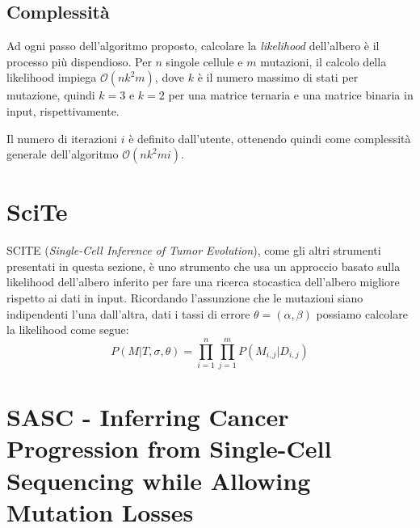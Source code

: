\subsection{Complessità}
Ad ogni passo dell'algoritmo proposto, calcolare la \textit{likelihood} dell'albero è il processo più dispendioso. Per $n$ singole cellule e $m$ mutazioni, il calcolo della likelihood impiega $\mathcal{O} (nk^2m)$, dove $k$ è il numero massimo di stati per mutazione, quindi $k = 3$ e $k = 2$ per una matrice ternaria e una matrice binaria in input, rispettivamente.

Il numero di iterazioni $i$ è definito dall'utente, ottenendo quindi come complessità generale dell'algoritmo $\mathcal{O}(nk^2mi)$.

\section{SciTe \cite{scite}}
\label{chap:art-scite}
SCITE (\textit{Single-Cell Inference of Tumor Evolution}), come gli altri strumenti presentati in questa sezione, è uno strumento che usa un approccio basato sulla likelihood dell'albero inferito per fare una ricerca stocastica dell'albero migliore rispetto ai dati in input. Ricordando l'assunzione che le mutazioni siano indipendenti l'una dall'altra, dati i tassi di errore $\theta = (\alpha, \beta)$ possiamo calcolare la likelihood come segue:
\begin{equation}
  P(M | T, \sigma, \theta) = \prod_{i = 1}^{n}\prod_{j = 1}^{m} P(M_{i,j} | D_{i,j})
\end{equation}

\section{SASC - Inferring Cancer Progression from Single-Cell Sequencing while Allowing Mutation Losses \cite{SCiccolellaSasc}}
\label{chap:art-sasc}
